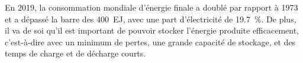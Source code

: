 En 2019, la consommation mondiale d'énergie finale a doublé par rapport à 1973 et a dépassé la barre des \qty{400}{\exa \joule}, avec une part d'électricité de \qty{19.7}{\percent}. %
De plus, il va de soi qu'il est important de pouvoir stocker l'énergie produite efficacement, c'est-à-dire avec un minimum de pertes, une grande capacité de stockage, et des temps de charge et de décharge courts.





